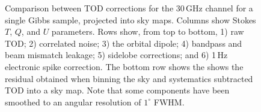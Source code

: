 \documentclass[twocolumn]{aa}
\begin{document}
\begin{figure}[p]
  \caption{Comparison between TOD corrections for the 30\,GHz channel
    for a single Gibbs sample, projected into sky maps. Columns show
    Stokes $T$, $Q$, and $U$ parameters. Rows show, from top to
    bottom, 1) raw TOD; 2) correlated noise; 3) the orbital dipole; 4)
    bandpass and beam mismatch leakage; 5) sidelobe corrections; and
    6) 1\,Hz electronic spike correction. The bottom row shows the
    shows the residual obtained when binning the sky and systematics
    subtracted TOD into a sky map. Note that some components have been
    smoothed to an angular resolution of $1^{\circ}$ FWHM.  }\label{fig:corrmaps30}
\end{figure}
\end{document}
